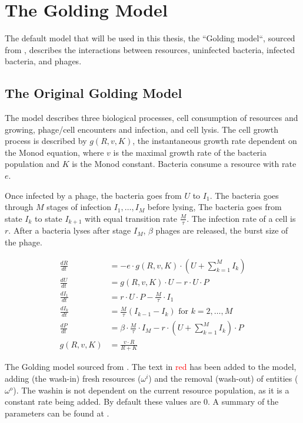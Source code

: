 \section{The Golding Model}
\label{sec:golding_model}
The default model that will be used in this thesis, the “Golding model“, sourced from \citet{gengUsingBacterialPopulation2024}, describes the interactions between resources, uninfected bacteria, infected bacteria, and phages. 

\subsection{The Original Golding Model}
The model describes three biological processes, cell consumption of resources and growing, phage/cell encounters and infection, and cell lysis. 
The cell growth process is described by $g(R, v, K)$, the instantaneous growth rate dependent on the Monod equation, where $v$ is the maximal growth rate of the bacteria population and $K$ is the Monod constant. 
Bacteria consume a resource with rate $e$. 

Once infected by a phage, the bacteria goes from $U$ to $I_1$. 
The bacteria goes through $M$ stages of infection $I_1, \dots, I_M$ before lysing, 
The bacteria goes from state $I_k$ to state $I_{k+1}$ with equal transition rate $\frac{M}{\tau}$. 
The infection rate of a cell is $r$. 
After a bacteria lyses after stage $I_M$, $\beta$ phages are released, the burst size of the phage. 

\begin{eqfloat}[ht!]
    \begin{align}
        \frac{dR}{dt} &= -e \cdot g(R, v, K)\cdot (U + \sum_{k=1}^{M} I_k)\\
        \frac{dU}{dt} &= g(R, v, K)\cdot U - r\cdot U \cdot P\\
        \frac{dI_1}{dt} &= r\cdot U \cdot P - \frac{M}{\tau}\cdot I_1\\
        \frac{dI_k}{dt} &= \frac{M}{\tau}(I_{k-1}-I_k) \text{ for } k=2, \dots, M \\
        \frac{dP}{dt} &= \beta \cdot\frac{M}{\tau} \cdot I_M - r\cdot(U + \sum_{k=1}^{M} I_k)\cdot P \\
        g(R, v, K) &= \frac{v\cdot R}{R + K}
        \label{eq:golding_model}
    \end{align}
    \caption{
        The Golding model sourced from \citet{gengUsingBacterialPopulation2024}. 
        The text in \textcolor{red}{red} has been added to the model, adding (the wash-in) fresh resources ($\omega^i$) and the removal (wash-out) of entities ($\omega^o$). 
        The washin is not dependent on the current resource population, as it is a constant rate being added. 
        By default these values are 0.
        A summary of the parameters can be found at . 
    }
\end{eqfloat}

